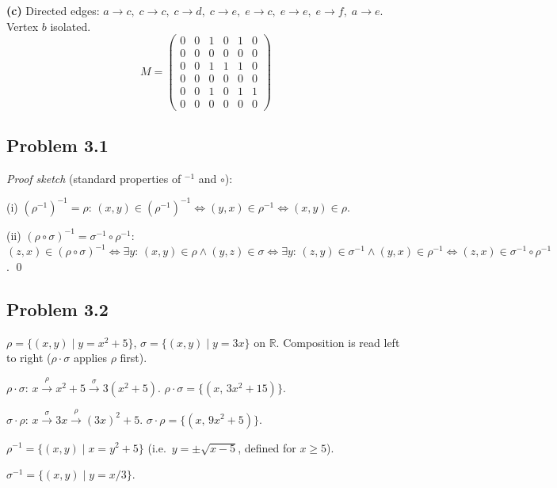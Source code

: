 \textbf{(c)} Directed edges: $a\!\to\!c,\; c\!\to\!c,\; c\!\to\!d,\; c\!\to\!e,\; e\!\to\!c,\; e\!\to\!e,\; e\!\to\!f,\; a\!\to\!e$. Vertex $b$ isolated.
\[
  M = \begin{pmatrix}
  0&0&1&0&1&0\\0&0&0&0&0&0\\0&0&1&1&1&0\\0&0&0&0&0&0\\0&0&1&0&1&1\\0&0&0&0&0&0
  \end{pmatrix}
\]


\subsection*{Problem 3.1}

\emph{Proof sketch} (standard properties of ${}^{-1}$ and $\circ$):

(i) $(\rho^{-1})^{-1}=\rho$: $(x,y)\in(\rho^{-1})^{-1}\Leftrightarrow (y,x)\in\rho^{-1}\Leftrightarrow (x,y)\in\rho$.

(ii) $(\rho\circ\sigma)^{-1}=\sigma^{-1}\circ\rho^{-1}$: $(z,x)\in(\rho\circ\sigma)^{-1} \Leftrightarrow \exists y\!:\,(x,y)\in\rho\land(y,z)\in\sigma \Leftrightarrow \exists y\!:\,(z,y)\in\sigma^{-1}\land(y,x)\in\rho^{-1} \Leftrightarrow (z,x)\in\sigma^{-1}\circ\rho^{-1}$. \qed


\subsection*{Problem 3.2}

$\rho=\{(x,y)\mid y=x^2+5\}$, $\sigma=\{(x,y)\mid y=3x\}$ on $\mathbb{R}$.
Composition is read left to right ($\rho\cdot\sigma$ applies $\rho$ first).

$\rho\cdot\sigma$: $x\xrightarrow{\rho}x^2+5\xrightarrow{\sigma}3(x^2+5)$. \;$\boxed{\rho\cdot\sigma=\{(x,\,3x^2+15)\}}$.

$\sigma\cdot\rho$: $x\xrightarrow{\sigma}3x\xrightarrow{\rho}(3x)^2+5$. \;$\boxed{\sigma\cdot\rho=\{(x,\,9x^2+5)\}}$.

$\boxed{\rho^{-1}=\{(x,y)\mid x=y^2+5\}}$ (i.e.\ $y=\pm\sqrt{x-5}$, defined for $x\ge 5$).

$\boxed{\sigma^{-1}=\{(x,y)\mid y=x/3\}}$.

